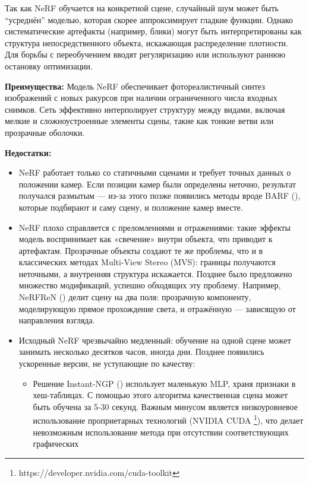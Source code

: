 Так как NeRF обучается на конкретной сцене, случайный шум может быть ``усреднён''
моделью, которая скорее аппроксимирует гладкие функции. Однако систематические
артефакты (например, блики) могут быть интерпретированы как структура
непосредственного объекта, искажающая распределение плотности. Для борьбы с
переобучением вводят регуляризацию или используют раннюю остановку оптимизации.

\textbf{Преимущества:}
Модель NeRF обеспечивает фотореалистичный синтез изображений с новых ракурсов
при наличии ограниченного числа входных снимков. Сеть эффективно интерполирует
структуру между видами, включая мелкие и сложноустроенные элементы сцены, такие
как тонкие ветви или прозрачные оболочки.

\textbf{Недостатки:}
\begin{itemize}
	\item NeRF работает только со статичными сценами и требует точных данных о
	положении камер. Если позиции камер были определены неточно, результат
	получался размытым — из-за этого позже появились методы вроде BARF
	(\cite{lin2021barfbundleadjustingneuralradiance}), которые подбирают и саму
	сцену, и положение камер вместе.
	\item NeRF плохо справляется с преломлениями и отражениями: такие
	эффекты модель воспринимает как «свечение» внутри объекта, что приводит к
	артефактам. Прозрачные объекты создают те же проблемы, что и в классических
	методах Multi-View Stereo (MVS): границы получаются неточными, а внутренняя
	структура искажается. Позднее было предложено множество модификаций, успешно
	обходящих эту проблему. Например, NeRFReN
	(\cite{guo2022nerfrenneuralradiancefields}) делит сцену на два поля:
	прозрачную компоненту, моделирующую прямое прохождение света, и отражённую —
	зависящую от направления взгляда.
	\item Исходный NeRF чрезвычайно медленный: обучение на одной сцене может занимать
	несколько десятков часов, иногда дни. Позднее появились ускоренные версии, не уступающие
	по качеству:
	\begin{itemize}
		\item Решение Instant-NGP (\cite{M_ller_2022}) использует маленькую MLP, храня признаки в хеш-таблицах.
		С помощью этого алгоритма качественная сцена может быть обучена за 5-30 секунд.
		Важным минусом является низкоуровневое использование проприетарных технологий (NVIDIA CUDA \footnote{https://developer.nvidia.com/cuda-toolkit}),
		что делает невозможным использование метода при отсутствии соответствующих графических

\end{itemize}
\end{itemize}
